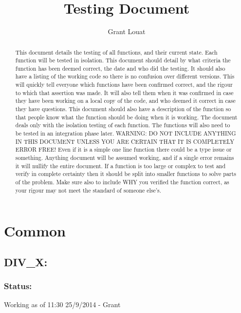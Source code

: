 \documentclass[]{article}
\title{Testing Document}
\author{Grant Louat}
\begin{document}
\maketitle

\begin{abstract}
This document details the testing of all functions, and their current state. Each function will be tested in isolation. This document should detail by what criteria the function has been deemed correct, the date and who did the testing. It should also have a listing of the working code so there is no confusion over different versions. This will quickly tell everyone which functions have been confirmed correct, and the rigour to which that assertion was made. It will also tell them when it was confirmed in case they have been working on a local copy of the code, and who deemed it correct in case they have questions. This document should also have a description of the function so that people know what the function should be doing when it is working.\newline
The document deals only with the isolation testing of each function. The functions will also need to be tested in an integration phase later. \newline
WARNING: DO NOT INCLUDE ANYTHING IN THIS DOCUMENT UNLESS YOU ARE CERTAIN THAT IT IS COMPLETELY ERROR FREE! \newline Even if it is a simple one line function there could be a type issue or something. Anything document will be assumed working, and if a single error remains it will nullify the entire document. If a function is too large or complex to test and verify in complete certainty then it should be split into smaller functions to solve parts of the problem. Make sure also to include WHY you verified the function correct, as your rigour may not meet the standard of someone else's.
\end{abstract}

\newpage
\section{Common}

\subsection{DIV\_X:}
\subsubsection{Status:}
Working as of 11:30 25/9/2014 - Grant
\end{document}
